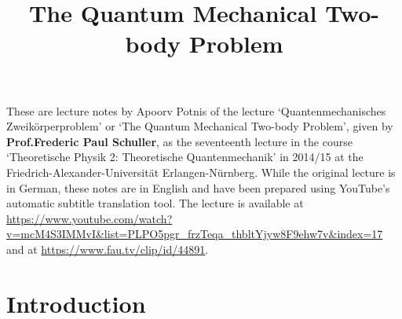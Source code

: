 \documentclass[12pt, a4 paper]{article}
\title{The Quantum Mechanical Two-body Problem}
\author{}
\date{\vspace{-5ex}}
\theoremstyle{definition}
\begin{document}
	\maketitle

	These are lecture notes by Apoorv Potnis of the lecture `Quantenmechanisches Zweikörperproblem' or `The Quantum Mechanical Two-body Problem', given by \textbf{Prof.\@ Frederic Paul Schuller}, as the seventeenth lecture in the course `Theoretische Physik 2: Theoretische Quantenmechanik' in 2014/15 at the Friedrich-Alexander-Universität Erlangen-Nürnberg. While the original lecture is in German, these notes are in English and have been prepared using YouTube's automatic subtitle translation tool. The lecture is available at \url{https://www.youtube.com/watch?v=mcM4S3IMMvI&list=PLPO5pgr_frzTeqa_thbltYjyw8F9ehw7v&index=17} and at \url{https://www.fau.tv/clip/id/44891}.

	\tableofcontents

	\section{Introduction}
\end{document}
